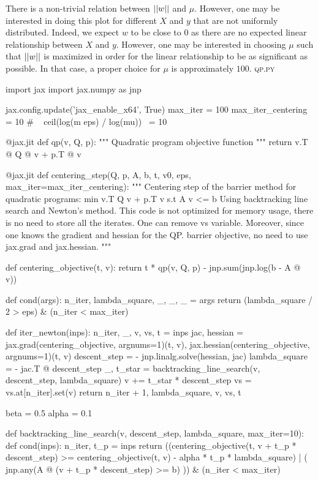 \documentclass{article}
\DeclarePairedDelimiter\norm{||}{||}
\begin{document}
%
There is a non-trivial relation between $\norm{w}$ and $\mu$. However, one may be interested in doing this plot for different $X$ and $y$ that are not uniformly distributed. Indeed, we expect $w$ to be close to $0$ as there are no expected linear relationship between $X$ and $y$. However, one may be interested in choosing $\mu$ such that $\norm{w}$ is maximized in order for the linear relationship to be as significant as possible. In that case, a proper choice for $\mu$ is approximately $100$.
\newpage 
\textsc{qp.py}
\begin{python}
import jax
import jax.numpy as jnp

jax.config.update('jax_enable_x64', True)
max_iter = 100
max_iter_centering = 10  # ~ ceil(log(m eps) / log(mu)) ~= 10


@jax.jit
def qp(v, Q, p):
    """
    Quadratic program objective function
    """
    return v.T @ Q @ v + p.T @ v


@jax.jit
def centering_step(Q, p, A, b, t, v0, eps, max_iter=max_iter_centering):
    """
    Centering step of the barrier method for quadratic programs:
        min v.T Q v + p.T v
        s.t A v <= b
    Using backtracking line search and Newton's method.
    This code is not optimized for memory usage, there is no need to store all the iterates.
    One can remove vs variable.
    Moreover, since one knows the gradient and hessian for the QP. barrier objective, no need to use jax.grad and jax.hessian.
    """

    def centering_objective(t, v):
        return t * qp(v, Q, p) - jnp.sum(jnp.log(b - A @ v))

    def cond(args):
        n_iter, lambda_square, _, _, _ = args
        return (lambda_square / 2 > eps) & (n_iter < max_iter)

    def iter_newton(inps):
        n_iter, _, v, vs, t = inps
        jac, hessian = jax.grad(centering_objective, argnums=1)(t, v), jax.hessian(centering_objective, argnums=1)(t, v)
        descent_step = - jnp.linalg.solve(hessian, jac)
        lambda_square = - jac.T @ descent_step
        _, t_star = backtracking_line_search(v, descent_step, lambda_square)
        v += t_star * descent_step
        vs = vs.at[n_iter].set(v)
        return n_iter + 1, lambda_square, v, vs, t

    beta = 0.5
    alpha = 0.1

    def backtracking_line_search(v, descent_step, lambda_square, max_iter=10):
        def cond(inps):
            n_iter, t_p = inps
            return ((centering_objective(t, v + t_p * descent_step) >= centering_objective(t,
                                                                                           v) - alpha * t_p * lambda_square) | (
                        jnp.any(A @ (v + t_p * descent_step) >= b)
                    )) & (n_iter < max_iter)


\end{python}
\end{document}
